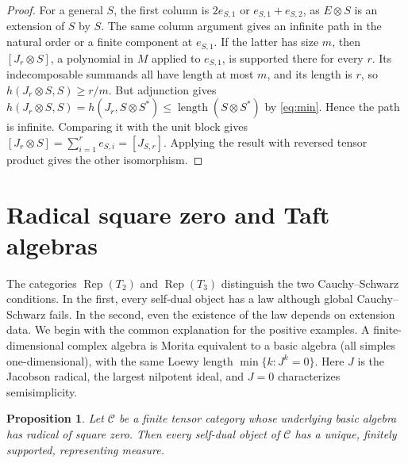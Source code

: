 \documentclass[11pt,reqno]{amsart}
\newtheorem{proposition}[theorem]{Proposition}
\theoremstyle{definition}
\newcommand{\C}{\mathcal C}
\newcommand{\Rep}{\operatorname{Rep}}
\begin{document}
\begin{proof}
For a general $S$, the first column is $2e_{S,1}$ or $e_{S,1}+e_{S,2}$,
as $E\otimes S$ is an extension of $S$ by $S$. The same column argument
gives an infinite path in the natural order or a finite component at
$e_{S,1}$. If the latter has size $m$, then $[J_r\otimes S]$, a polynomial
in $M$ applied to $e_{S,1}$, is supported there for every $r$. Its
indecomposable summands all have length at most $m$, and its length is $r$,
so $h(J_r\otimes S,S)\geq r/m$. But adjunction gives
$h(J_r\otimes S,S)=h(J_r,S\otimes S^*)\leq\operatorname{length}(S\otimes S^*)$
by \eqref{eq:min}. Hence the path is infinite. Comparing it with the unit
block gives $[J_r\otimes S]=\sum_{i=1}^r e_{S,i}=[J_{S,r}]$.
Applying the result with reversed tensor product gives the other isomorphism.
\end{proof}

\section{Radical square zero and Taft algebras}\label{sec:hopf}
The categories $\Rep(T_2)$ and $\Rep(T_3)$ distinguish the two Cauchy--Schwarz conditions. In the first, every self-dual object has a law although global Cauchy--Schwarz fails. In the second, even the existence of the law depends on extension data. We begin with the common explanation for the positive examples. A finite-dimensional complex algebra is Morita equivalent to a basic algebra (all simples one-dimensional), with the same Loewy length $\min\{k:J^k=0\}$. Here $J$ is the Jacobson radical, the largest nilpotent ideal, and $J=0$ characterizes semisimplicity.

\begin{proposition}\label{prop:loewy}
Let $\C$ be a finite tensor category whose underlying basic algebra has radical of square zero. Then every self-dual object of $\C$ has a unique, finitely supported, representing measure.
\end{proposition}
\end{document}
